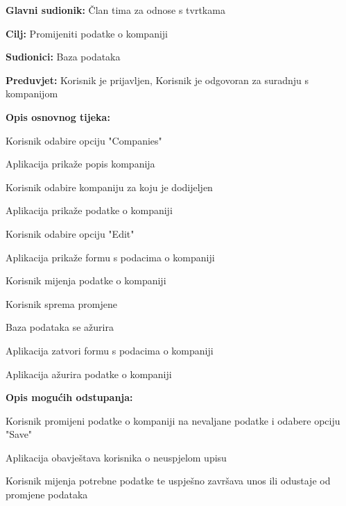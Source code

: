 					\noindent {}
					\begin{packed_item}

						\item \textbf{Glavni sudionik:} Član tima za odnose s tvrtkama
						\item \textbf{Cilj:} Promijeniti podatke o kompaniji
						\item \textbf{Sudionici:} Baza podataka
						\item \textbf{Preduvjet:} Korisnik je prijavljen, Korisnik je odgovoran za suradnju s kompanijom
						\item \textbf{Opis osnovnog tijeka:}

						\item[] \begin{packed_enum}

							\item Korisnik odabire opciju "Companies"
							\item Aplikacija prikaže popis kompanija
							\item Korisnik odabire kompaniju za koju je dodijeljen
							\item Aplikacija prikaže podatke o kompaniji
							\item Korisnik odabire opciju "Edit"
							\item Aplikacija prikaže formu s podacima o kompaniji
							\item Korisnik mijenja podatke o kompaniji
							\item Korisnik sprema promjene
							\item Baza podataka se ažurira
							\item Aplikacija zatvori formu s podacima o kompaniji
							\item Aplikacija ažurira podatke o kompaniji
						\end{packed_enum}

						\item \textbf{Opis mogućih odstupanja:}

						\item[] \begin{packed_item}

							\item[5.b] Korisnik promijeni podatke o kompaniji na nevaljane podatke i odabere opciju "Save"
							\item[] \begin{packed_enum}

								\item Aplikacija obavještava korisnika o neuspjelom upisu
								\item Korisnik mijenja potrebne podatke te uspješno završava unos ili
								odustaje od promjene podataka

							\end{packed_enum}

						\end{packed_item}
					\end{packed_item}


